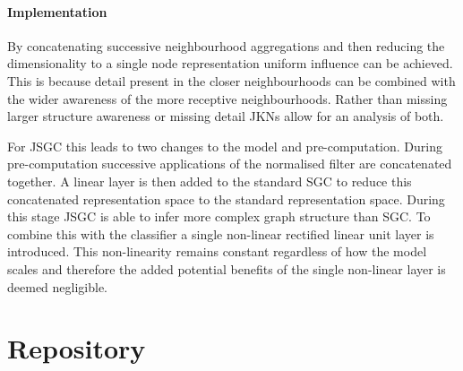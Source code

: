 \paragraph{Implementation}
By concatenating successive neighbourhood aggregations and then reducing the dimensionality to a single node representation uniform influence can be achieved.
This is because detail present in the closer neighbourhoods can be combined with the wider awareness of the more receptive neighbourhoods.
Rather than missing larger structure awareness or missing detail JKNs allow for an analysis of both.

For JSGC this leads to two changes to the model and pre-computation.
During pre-computation successive applications of the normalised filter are concatenated together.
A linear layer is then added to the standard SGC to reduce this concatenated representation space to the standard representation space.
During this stage JSGC is able to infer more complex graph structure than SGC.
To combine this with the classifier a single non-linear rectified linear unit layer is introduced.
This non-linearity remains constant regardless of how the model scales and therefore the added potential benefits of the single non-linear layer is deemed negligible.

\section{Repository}

